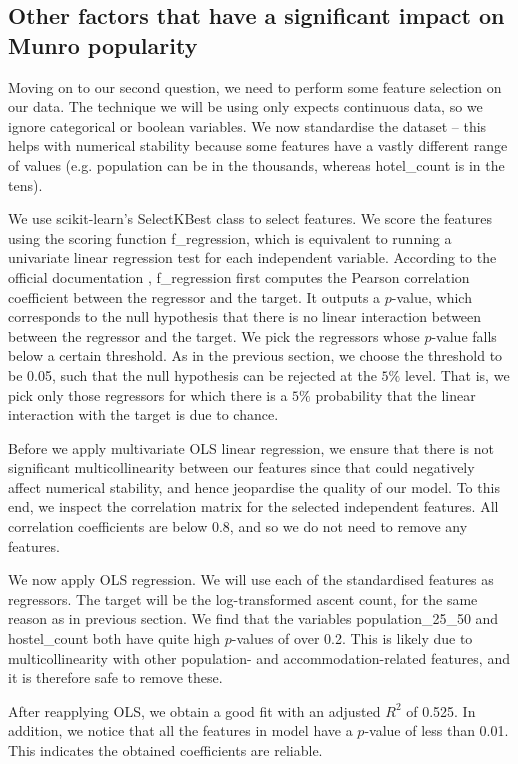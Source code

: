 \documentclass[11pt,a4paper]{article}
\begin{document}
\subsection{Other factors that have a significant impact on Munro popularity}
Moving on to our second question, we need to perform some feature selection on our data. The technique we will be using only expects continuous data, so we ignore categorical or boolean variables. We now standardise the dataset – this helps with numerical stability because some features have a vastly different range of values (e.g. population can be in the thousands, whereas hotel\_count is in the tens).

We use scikit-learn's SelectKBest class to select features. We score the features using the scoring function f\_regression, which is equivalent to running a univariate linear regression test for each independent variable. According to the official documentation \cite{scikit-learn}, f\_regression first computes the Pearson correlation coefficient between the regressor and the target. It outputs a $p$-value, which corresponds to the null hypothesis that there is no linear interaction between between the regressor and the target. We pick the regressors whose $p$-value falls below a certain threshold. As in the previous section, we choose the threshold to be 0.05, such that the null hypothesis can be rejected at the $5\%$ level. That is, we pick only those regressors for which there is a $5\%$ probability that the linear interaction with the target is due to chance.

Before we apply multivariate OLS linear regression, we ensure that there is not significant multicollinearity between our features since that could negatively affect numerical stability, and hence jeopardise the quality of our model. To this end, we inspect the correlation matrix for the selected independent features. All correlation coefficients are below 0.8, and so we do not need to remove any features.

We now apply OLS regression. We will use each of the standardised features as regressors. The target will be the log-transformed ascent count, for the same reason as in previous section. We find that the variables population\_25\_50 and hostel\_count both have quite high $p$-values of over 0.2. This is likely due to multicollinearity with other population- and accommodation-related features, and it is therefore safe to remove these.

After reapplying OLS, we obtain a good fit with an adjusted $R^{2}$ of 0.525. In addition, we notice that all the features in model have a $p$-value of less than 0.01. This indicates the obtained coefficients are reliable.
\end{document}

